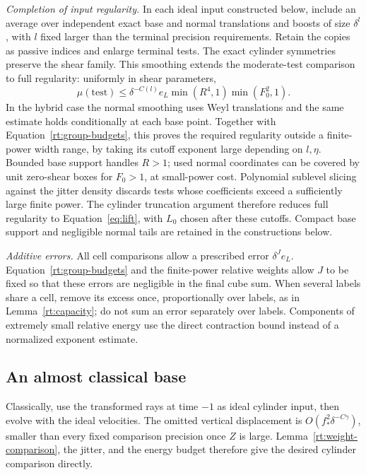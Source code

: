 \smallskip\noindent
\emph{Completion of input regularity.}
In each ideal input constructed below, include an average over
independent exact base and normal translations and boosts of size
$\delta^l$, with $l$ fixed larger than the terminal precision
requirements.  Retain the copies as passive indices and enlarge
terminal tests.  The exact cylinder symmetries preserve the shear
family.  This smoothing extends the moderate-test comparison to full
regularity: uniformly in shear parameters,
\[
 \mu(\text{test})\le
 \delta^{-C(l)}e_L\min(R^4,1)\min(F_0^2,1).
\]
In the hybrid case the normal smoothing uses Weyl translations and the
same estimate holds conditionally at each base point.  Together with
Equation~\eqref{rt:group-budgets}, this proves the required regularity
outside a finite-power width range, by taking its cutoff exponent
large depending on $l,\eta$.  Bounded base support handles $R>1$;
used normal coordinates can be covered by unit zero-shear boxes for
$F_0>1$, at small-power cost.  Polynomial sublevel slicing against the
jitter density discards tests whose coefficients exceed a sufficiently
large finite power.  The cylinder truncation argument therefore reduces
full regularity to Equation~\eqref{eq:lift}, with $L_0$ chosen after
these cutoffs.  Compact base support and negligible normal tails are
retained in the constructions below.

\smallskip\noindent
\emph{Additive errors.}
All cell comparisons allow a prescribed error $\delta^Je_L$.
Equation~\eqref{rt:group-budgets} and the finite-power relative weights
allow $J$ to be fixed so that these errors are negligible in the final
cube sum.  When several labels share a cell, remove its excess once,
proportionally over labels, as in Lemma~\ref{rt:capacity}; do not sum an
error separately over labels.  Components of extremely small relative
energy use the direct contraction bound instead of a normalized
exponent estimate.

\subsection{An almost classical base}

Classically, use the transformed rays at time $-1$ as ideal cylinder
input, then evolve with the ideal velocities.  The omitted vertical
displacement is $O(f_*^2\delta^{-C\gamma})$, smaller than every fixed
comparison precision once $Z$ is large.  Lemma~\ref{rt:weight-comparison},
the jitter, and the energy budget therefore give the desired cylinder
comparison directly.

